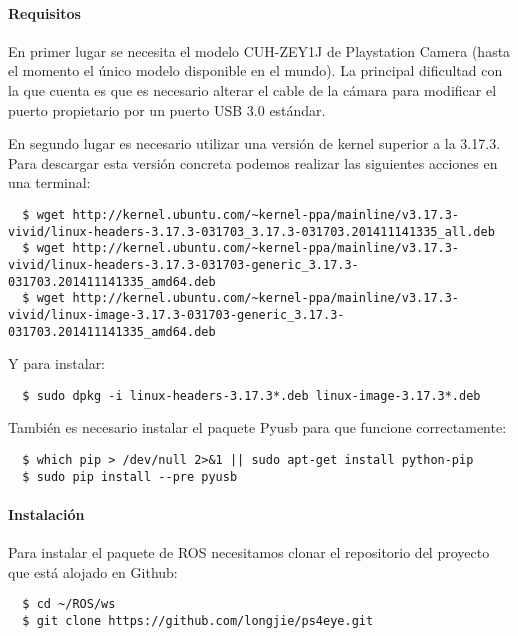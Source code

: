 \paragraph{Requisitos} \hspace{0pt}

En primer lugar se necesita el modelo CUH-ZEY1J de Playstation Camera (hasta el
momento el único modelo disponible en el mundo). La principal dificultad con la
que cuenta es que es necesario alterar el cable de la cámara para modificar el
puerto propietario por un puerto USB 3.0 estándar.

En segundo lugar es necesario utilizar una versión de kernel superior a la
3.17.3. Para descargar esta versión concreta podemos realizar las siguientes
acciones en una terminal:
\\
\begin{lstlisting}
  $ wget http://kernel.ubuntu.com/~kernel-ppa/mainline/v3.17.3-vivid/linux-headers-3.17.3-031703_3.17.3-031703.201411141335_all.deb
  $ wget http://kernel.ubuntu.com/~kernel-ppa/mainline/v3.17.3-vivid/linux-headers-3.17.3-031703-generic_3.17.3-031703.201411141335_amd64.deb
  $ wget http://kernel.ubuntu.com/~kernel-ppa/mainline/v3.17.3-vivid/linux-image-3.17.3-031703-generic_3.17.3-031703.201411141335_amd64.deb
\end{lstlisting}

Y para instalar:
\\
\begin{lstlisting}
  $ sudo dpkg -i linux-headers-3.17.3*.deb linux-image-3.17.3*.deb
\end{lstlisting}

También es necesario instalar el paquete Pyusb para que funcione correctamente:
\\
\begin{lstlisting}
  $ which pip > /dev/null 2>&1 || sudo apt-get install python-pip
  $ sudo pip install --pre pyusb
\end{lstlisting}

\paragraph{Instalación} \hspace{0pt}

Para instalar el paquete de ROS necesitamos clonar el repositorio del proyecto
que está alojado en Github:
\\
\begin{lstlisting}
  $ cd ~/ROS/ws
  $ git clone https://github.com/longjie/ps4eye.git
\end{lstlisting}

